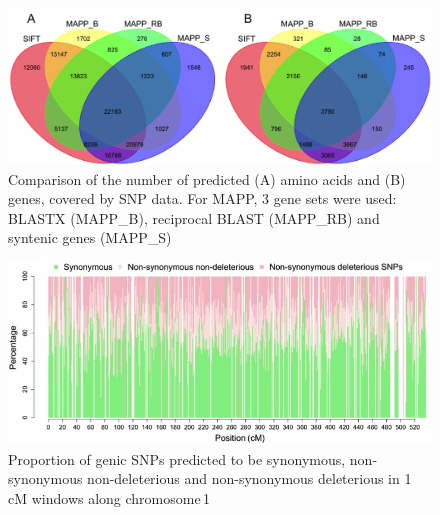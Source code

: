 \documentclass[12pt]{article}
\begin{document}
\begin{figure}[h]
  \begin{center}
   \includegraphics[width=150mm]{VennDiagram.png}
    \caption{Comparison of the number of predicted (A) amino acids and (B) genes, covered by SNP data. For MAPP, 3 gene sets were used: BLASTX (MAPP\_B), reciprocal BLAST (MAPP\_RB) and syntenic genes (MAPP\_S)}
   \label{figureS2}
  \end{center}
\end{figure}

\begin{figure}[ht]
  \begin{center}
   \includegraphics[width=140mm]{PerDelGenome_ch1cM.jpg}
    \caption{Proportion of genic SNPs predicted to be synonymous, non-synonymous non-deleterious and non-synonymous deleterious in 1\,cM windows along chromosome\,1} 
   \label{non_syn_chr1cM}
  \end{center}
\end{figure}
\end{document}
